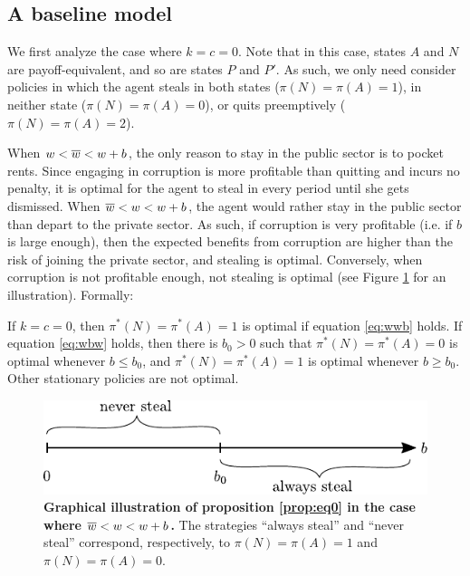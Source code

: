 {\subsection{A baseline model}

We first analyze the case where $k = c = 0$. Note that in this case, states $A$ and $N$ are payoff-equivalent, and so are states $P$ and $P'$. As such, we only need consider policies in which the agent steals in both states ($\pi(N)=\pi(A)=1$), in neither state ($\pi(N)=\pi(A)=0$), or quits preemptively ($\pi(N)=\pi(A)=2$). 

When $w < \overline{w} < w+b$, the only reason to stay in the public sector is to pocket rents. Since engaging in corruption is more profitable than quitting and incurs no penalty, it is optimal for the agent to steal in every period until she gets dismissed. When $\overline{w} < w < w+b$, the agent would rather stay in the public sector than depart to the private sector. As such, if corruption is very profitable (i.e. if $b$ is large enough), then the expected benefits from corruption are higher than the risk of joining the private sector, and stealing is optimal. Conversely, when corruption is not profitable enough, not stealing is optimal (see Figure \ref{fig:eq0} for an illustration). Formally: 

\begin{proposition}
    \label{prop:eq0}
    If $k = c = 0$, then $\pi^*(N)=\pi^*(A)=1$ is optimal if equation \ref{eq:wwb} holds. If equation \ref{eq:wbw} holds, then there is $b_0 > 0$ such that $\pi^*(N)=\pi^*(A)=0$ is optimal whenever $b \leq b_0$, and $\pi^*(N)=\pi^*(A)=1$ is optimal whenever $b \geq b_0$. Other stationary policies are not optimal. 
\end{proposition}

\begin{figure}[H]
    \centering
    \includegraphics{chapters/chapter_2/figures_theory/eq_baseline.pdf}
    \caption{{\bf Graphical illustration of proposition \ref{prop:eq0} in the case where $\overline{w} < w < w+b$.} The strategies ``always steal'' and ``never steal'' correspond, respectively, to $\pi(N) = \pi(A) = 1$ and $\pi(N) = \pi(A) = 0$.}
    \label{fig:eq0}
\end{figure}

}
